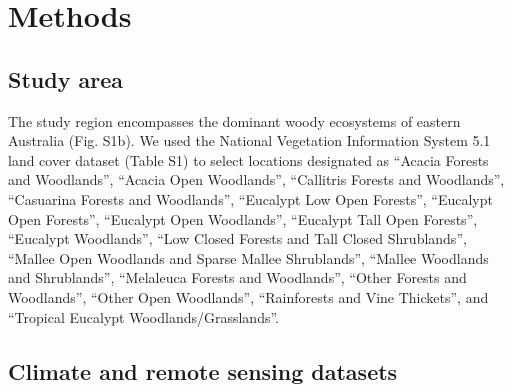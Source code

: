 \documentclass[gc, manuscript]{copernicus}
\begin{document}
\section{Methods}

\subsection{Study area}

The study region encompasses the dominant woody ecosystems of eastern
Australia (Fig. S1b). We used the National Vegetation Information System
5.1 land cover dataset (Table S1) to select locations designated as
``Acacia Forests and Woodlands'', ``Acacia Open Woodlands'', ``Callitris
Forests and Woodlands'', ``Casuarina Forests and Woodlands'', ``Eucalypt
Low Open Forests'', ``Eucalypt Open Forests'', ``Eucalypt Open
Woodlands'', ``Eucalypt Tall Open Forests'', ``Eucalypt Woodlands'',
``Low Closed Forests and Tall Closed Shrublands'', ``Mallee Open
Woodlands and Sparse Mallee Shrublands'', ``Mallee Woodlands and
Shrublands'', ``Melaleuca Forests and Woodlands'', ``Other Forests and
Woodlands'', ``Other Open Woodlands'', ``Rainforests and Vine
Thickets'', and ``Tropical Eucalypt Woodlands/Grasslands''.

\subsection{Climate and remote sensing datasets}
\end{document}
